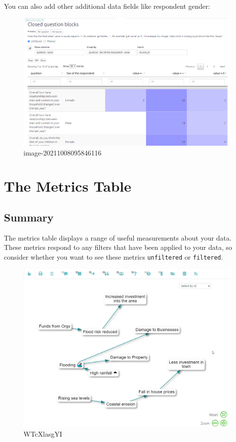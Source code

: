 \documentclass[
]{book}
\begin{document}
You can also add other additional data fields like respondent gender:

\begin{figure}
\centering
\includegraphics[width=6.77083in,height=\textheight]{_assets/image-20211008095846116.png}
\caption{image-20211008095846116}
\end{figure}

\hypertarget{xmetrics}{%
\chapter{The Metrics Table}\label{xmetrics}}

\hypertarget{summary}{%
\section{Summary}\label{summary}}

The metrics table displays a range of useful measurements about your data. These metrics respond to any filters that have been applied to your data, so consider whether you want to see these metrics \texttt{unfiltered} or \texttt{filtered}.

\begin{figure}
\centering
\includegraphics[width=6.77083in,height=\textheight]{_assets/WTcXlasgYI.gif}
\caption{WTcXlasgYI}
\end{figure}
\end{document}
